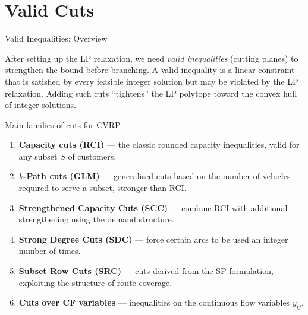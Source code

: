 \documentclass[aspectratio=169,10pt]{beamer}
\begin{document}
\section{Valid Cuts}

\begin{frame}[allowframebreaks]{Valid Inequalities: Overview}

After setting up the LP relaxation, we need \emph{valid inequalities}
(cutting planes) to strengthen the bound before branching. A valid
inequality is a linear constraint that is satisfied by every feasible
integer solution but may be violated by the LP relaxation. Adding such
cuts ``tightens'' the LP polytope toward the convex hull of integer
solutions.

\begin{block}{Main families of cuts for CVRP}
\begin{enumerate}
  \item \textbf{Capacity cuts (RCI)} --- the classic rounded capacity
        inequalities, valid for any subset $S$ of customers.
  \item \textbf{$k$-Path cuts (GLM)} --- generalised cuts based on the
        number of vehicles required to serve a subset, stronger than RCI.
  \item \textbf{Strengthened Capacity Cuts (SCC)} --- combine RCI with
        additional strengthening using the demand structure.
  \item \textbf{Strong Degree Cuts (SDC)} --- force certain arcs to be
        used an integer number of times.
  \item \textbf{Subset Row Cuts (SRC)} --- cuts derived from the SP
        formulation, exploiting the structure of route coverage.
  \item \textbf{Cuts over CF variables} --- inequalities on the
        continuous flow variables $y_{ij}$.
\end{enumerate}
\end{block}

\end{frame}
\end{document}
